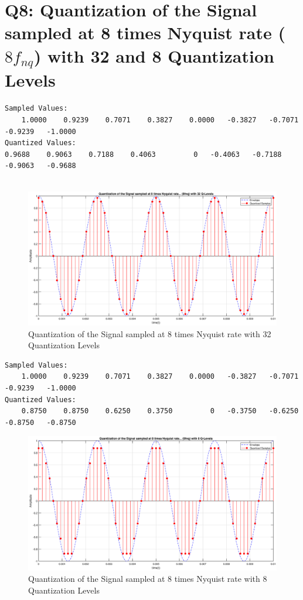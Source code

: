 \documentclass[a4paper,11pt]{article}%
\begin{document}
\pagebreak
\section*{Q8: Quantization of the Signal sampled at 8 times Nyquist rate ($8f_{nq}$) with 32 and 8 Quantization Levels}

\begin{verbatim}
Sampled Values:		
	1.0000    0.9239    0.7071    0.3827    0.0000   -0.3827   -0.7071   -0.9239   -1.0000
Quantized Values:	
0.9688    0.9063    0.7188    0.4063         0   -0.4063   -0.7188   -0.9063   -0.9688
	
\end{verbatim}

\begin{figure}[!h]
	\centering
	\includegraphics[scale=0.42]{figures/q32l}
	\caption{Quantization of the Signal sampled at 8 times Nyquist rate with 32 Quantization Levels}
	\label{l32}
\end{figure}

\begin{verbatim}
Sampled Values:		
	1.0000    0.9239    0.7071    0.3827    0.0000   -0.3827   -0.7071   -0.9239   -1.0000
Quantized Values:	
	0.8750    0.8750    0.6250    0.3750         0   -0.3750   -0.6250   -0.8750   -0.8750
\end{verbatim}
\begin{figure}[!h]
	\centering
	\includegraphics[scale=0.42]{figures/q8l}
		\caption{Quantization of the Signal sampled at 8 times Nyquist rate with 8 Quantization Levels}
		\label{l8}
\end{figure}
\end{document}
